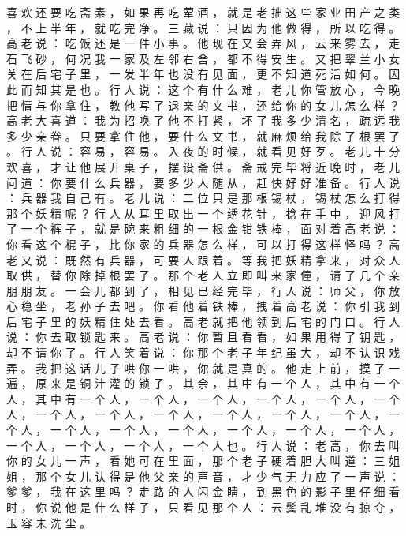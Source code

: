 {喜 欢 还 要 吃 斋 素 ， 如 果 再 吃 荤 酒 ， 就 是 老 拙 这 些 家 业 田 产 之 类 ， 不 上 半 年 ， 就 吃 完 净 。
三 藏 说 ： 只 因 为 他 做 得 ， 所 以 吃 得 。
高 老 说 ： 吃 饭 还 是 一 件 小 事 。
他 现 在 又 会 弄 风 ， 云 来 雾 去 ， 走 石 飞 砂 ， 何 况 我 一 家 及 左 邻 右 舍 ， 都 不 得 安 生 。
又 把 翠 兰 小 女 关 在 后 宅 子 里 ， 一 发 半 年 也 没 有 见 面 ， 更 不 知 道 死 活 如 何 。
因 此 而 知 其 是 也 。
行 人 说 ： 这 个 有 什 么 难 ， 老 儿 你 管 放 心 ， 今 晚 把 情 与 你 拿 住 ， 教 他 写 了 退 亲 的 文 书 ， 还 给 你 的 女 儿 怎 么 样 ？ 高 老 大 喜 道 ： 我 为 招 唤 了 他 不 打 紧 ， 坏 了 我 多 少 清 名 ， 疏 远 我 多 少 亲 眷 。
只 要 拿 住 他 ， 要 什 么 文 书 ， 就 麻 烦 给 我 除 了 根 罢 了 。
行 人 说 ： 容 易 ， 容 易 。
入 夜 的 时 候 ， 就 看 见 好 歹 。
老 儿 十 分 欢 喜 ， 才 让 他 展 开 桌 子 ， 摆 设 斋 供 。
斋 戒 完 毕 将 近 晚 时 ， 老 儿 问 道 ： 你 要 什 么 兵 器 ， 要 多 少 人 随 从 ， 赶 快 好 好 准 备 。
行 人 说 ： 兵 器 我 自 己 有 。
老 儿 说 ： 二 位 只 是 那 根 锡 杖 ， 锡 杖 怎 么 打 得 那 个 妖 精 呢 ？ 行 人 从 耳 里 取 出 一 个 绣 花 针 ， 捻 在 手 中 ， 迎 风 打 了 一 个 裤 子 ， 就 是 碗 来 粗 细 的 一 根 金 钳 铁 棒 ， 面 对 着 高 老 说 ： 你 看 这 个 棍 子 ， 比 你 家 的 兵 器 怎 么 样 ， 可 以 打 得 这 样 怪 吗 ？ 高 老 又 说 ： 既 然 有 兵 器 ， 可 要 人 跟 着 。
等 我 把 妖 精 拿 来 ， 对 众 人 取 供 ， 替 你 除 掉 根 罢 了 。
那 个 老 人 立 即 叫 来 家 僮 ， 请 了 几 个 亲 朋 朋 友 。
一 会 儿 都 到 了 ， 相 见 已 经 完 毕 ， 行 人 说 ： 师 父 ， 你 放 心 稳 坐 ， 老 孙 子 去 吧 。
你 看 他 着 铁 棒 ， 拽 着 高 老 说 ： 你 引 我 到 后 宅 子 里 的 妖 精 住 处 去 看 。
高 老 就 把 他 领 到 后 宅 的 门 口 。
行 人 说 ： 你 去 取 锁 匙 来 。
高 老 说 ： 你 暂 且 看 看 ， 如 果 用 得 了 钥 匙 ， 却 不 请 你 了 。
行 人 笑 着 说 ： 你 那 个 老 子 年 纪 虽 大 ， 却 不 认 识 戏 弄 。
我 把 这 话 儿 子 哄 你 一 哄 ， 你 就 是 真 的 。
他 走 上 前 ， 摸 了 一 遍 ， 原 来 是 铜 汁 灌 的 锁 子 。
其 余 ， 其 中 有 一 个 人 ， 其 中 有 一 个 人 ， 其 中 有 一 个 人 ， 一 个 人 ， 一 个 人 ， 一 个 人 ， 一 个 人 ， 一 个 人 ， 一 个 人 ， 一 个 人 ， 一 个 人 ， 一 个 人 ， 一 个 人 ， 一 个 人 ， 一 个 人 ， 一 个 人 ， 一 个 人 ， 一 个 人 ， 一 个 人 ， 一 个 人 ， 一 个 人 ， 一 个 人 ， 一 个 人 ， 一 个 人 ， 一 个 人 也 。
行 人 说 ： 老 高 ， 你 去 叫 你 的 女 儿 一 声 ， 看 她 可 在 里 面 ， 那 个 老 子 硬 着 胆 大 叫 道 ： 三 姐 姐 ， 那 个 女 儿 认 得 是 他 父 亲 的 声 音 ， 才 少 气 无 力 应 了 一 声 说 ： 爹 爹 ， 我 在 这 里 吗 ？
走 路 的 人 闪 金 睛 ， 到 黑 色 的 影 子 里 仔 细 看 时 ， 你 说 他 是 什 么 样 子 ， 只 看 见 那 个 人 ： 云 鬓 乱 堆 没 有 掠 夺 ， 玉 容 未 洗 尘 。
}
